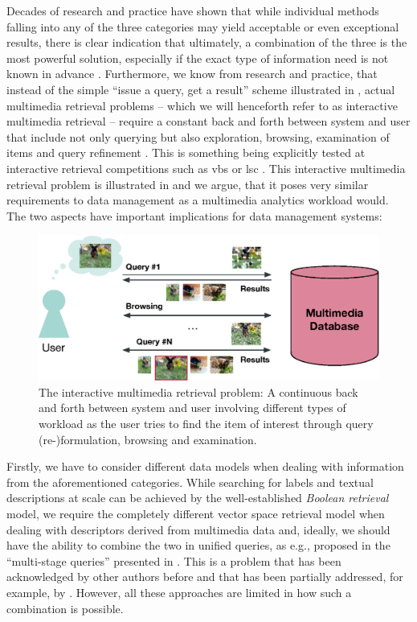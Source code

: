 Decades of research and practice have shown that while individual methods falling into any of the three categories may yield acceptable or even exceptional results, there is clear indication that ultimately, a combination of the three is the most powerful solution, especially if the exact type of information need is not known in advance . Furthermore, we know from research and practice, that instead of the simple ``issue a query, get a result'' scheme illustrated in , actual multimedia retrieval problems -- which we will henceforth refer to as interactive multimedia retrieval -- require a constant back and forth between system and user that include not only querying but also exploration, browsing, examination of items and query refinement \cite{Lokovc:2019Interactive,Gurrin:2019Invited}. This is something being explicitly tested at interactive retrieval competitions such as \acrfull{vbs} \cite{Schoeffmann:2019Video} or \acrfull{lsc} \cite{Gurrin:2021Introduction}. This interactive multimedia retrieval problem is illustrated in  and we argue, that it poses very similar requirements to data management as a multimedia analytics \cite{Chinchor:2010Multimedia} workload would. The two aspects have important implications for data management systems: 

\begin{figure}[tb]
    \centering
    \includegraphics[width=\textwidth]{figures/mr-actual.eps}
    \caption{The interactive multimedia retrieval problem: A continuous back and forth between system and user involving different types of workload as the user tries to find the item of interest through query (re-)formulation, browsing and examination.}
    \label{figure:mr-actual}
\end{figure}
 
Firstly, we have to consider different data models when dealing with information from the aforementioned categories. While searching for labels and textual descriptions at scale can be achieved by the well-established \emph{Boolean retrieval} model, we require the completely different vector space retrieval model when dealing with descriptors derived from multimedia data and, ideally, we should have the ability to combine the two in unified queries, as e.g., proposed in the ``multi-stage queries'' presented in \cite{Heller:2020Multi}. This is a problem that has been acknowledged by other authors before \cite{Jonson:2016}  and that has been partially addressed, for example, by \cite{Giangreco:2018thesis,Giangreco:2016adam,Wang2021:Milvus}. However, all these approaches are limited in how such a combination is possible.

